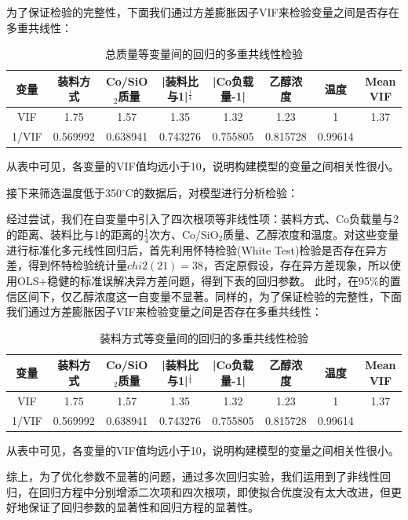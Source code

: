 \documentclass[a4paper,10.5pt]{ctexart}
\begin{document}
\par 为了保证检验的完整性，下面我们通过方差膨胀因子VIF来检验变量之间是否存在多重共线性：
\begin{table}[htbp]
  \centering
  \caption{总质量等变量间的回归的多重共线性检验}
    \begin{tabular}{cccccccc}
    \toprule[2pt]
    变量    & 装料方式  & Co/SiO$_2$质量 & |装料比与1|$^{\frac{1}{4}}$ & |Co负载量-1| & 乙醇浓度  & 温度    & Mean VIF \\
    \midrule
    VIF   & 1.75  & 1.57  & 1.35  & 1.32  & 1.23  & 1     & 1.37 \\
    1/VIF & 0.569992 & 0.638941 & 0.743276 & 0.755805 & 0.815728 & 0.99614 &  \\
    \bottomrule[2pt]
    \end{tabular}%
  \label{tab:addlabel}%
\end{table}%
\par 从表中可见，各变量的VIF值均远小于10，说明构建模型的变量之间相关性很小。

\par 接下来筛选温度低于350$^{\circ}$C的数据后，对模型进行分析检验：
\par 经过尝试，我们在自变量中引入了四次根项等非线性项：装料方式、Co负载量与2的距离、装料比与1的距离的$\frac{1}{4}$次方、Co/SiO$_2$质量、乙醇浓度和温度。对这些变量进行标准化多元线性回归后，首先利用怀特检验(White Test)检验是否存在异方差，得到怀特检验统计量$chi2(21)=38$，否定原假设，存在异方差现象，所以使用OLS+稳健的标准误解决异方差问题，得到下表的回归参数。
\clearpage
此时，在95$\%$的置信区间下，仅乙醇浓度这一自变量不显著。同样的，为了保证检验的完整性，下面我们通过方差膨胀因子VIF来检验变量之间是否存在多重共线性：
\begin{table}[htbp]
  \centering
  \caption{装料方式等变量间的回归的多重共线性检验}
    \begin{tabular}{cccccccc}
    \toprule[2pt]
    变量    & 装料方式  & Co/SiO$_2$质量 & |装料比与1|$^{\frac{1}{4}}$ & |Co负载量-1| & 乙醇浓度  & 温度    & Mean VIF \\
    \midrule
    VIF   & 1.75  & 1.57  & 1.35  & 1.32  & 1.23  & 1     & 1.37 \\
    1/VIF & 0.569992 & 0.638941 & 0.743276 & 0.755805 & 0.815728 & 0.99614 &  \\
    \bottomrule[2pt]
    \end{tabular}%
  \label{tab:addlabel}%
\end{table}%
\par 从表中可见，各变量的VIF值均远小于10，说明构建模型的变量之间相关性很小。
\par 综上，为了优化参数不显著的问题，通过多次回归实验，我们运用到了非线性回归，在回归方程中分别增添二次项和四次根项，即使拟合优度没有太大改进，但更好地保证了回归参数的显著性和回归方程的显著性。
\end{document}
